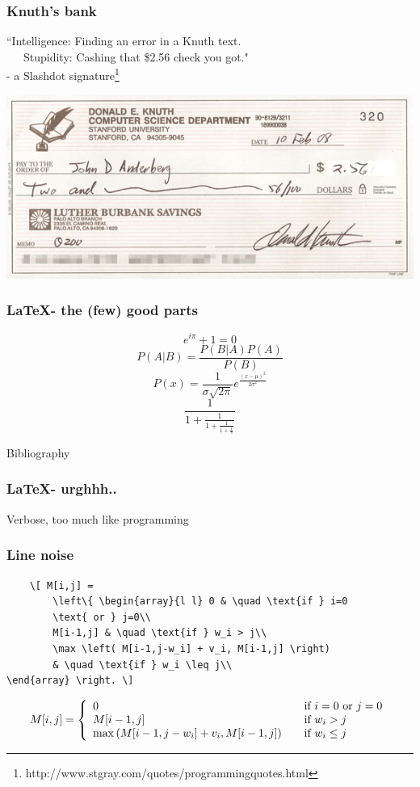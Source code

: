 \begin{frame}
	\frametitle{Knuth's bank}
``Intelligence: Finding an error in a Knuth text.\\
~~~Stupidity: Cashing that \$2.56 check you got." \\- a Slashdot signature\footnote{http://www.stgray.com/quotes/programmingquotes.html}

\begin{center}
	\includegraphics[scale=0.4]{hexadollar.jpg}
\end{center}

\end{frame}
\begin{frame}[allowframebreaks]
	\frametitle{\LaTeX - the (few) good parts}
	\huge
	\[e^{i\pi} + 1 = 0\]
	\framebreak
\[P(A|B) = \frac{P(B|A)P(A)}{P(B)}\]
\framebreak
\[
	P(x) = \frac{1}{{\sigma \sqrt {2\pi } }}e^{\frac{(x-\mu)^2}{2\sigma^2}}
\]
\framebreak
\[
	\frac{1}{\displaystyle 1+  \frac{1}{\displaystyle 1+ \frac{1}{\displaystyle 1+ \frac{1}{\pi}}}}
\]
\framebreak
\begin{center}
	Bibliography
\end{center}
\end{frame}
\begin{frame}
	\frametitle{\LaTeX - urghhh..}
	\begin{center}
		\huge
		Verbose, too much like programming
	\end{center}
\end{frame}

\begin{frame}[fragile]
	\frametitle{Line noise}

	\begin{verbatim}
	\[ M[i,j] = 
		\left\{ \begin{array}{l l} 0 & \quad \text{if } i=0 
		\text{ or } j=0\\
		M[i-1,j] & \quad \text{if } w_i > j\\
		\max \left( M[i-1,j-w_i] + v_i, M[i-1,j] \right)
		& \quad \text{if } w_i \leq j\\
\end{array} \right. \]

	\end{verbatim}
	\[ M[i,j] = \left\{ \begin{array}{l l} 0 & \quad \text{if } i=0 \text{ or } j=0\\ M[i-1,j] & \quad \text{if } w_i > j\\ \max \left( M[i-1,j-w_i] + v_i, M[i-1,j] \right)& \quad \text{if } w_i \leq j\\ \end{array} \right. \]
\end{frame}


